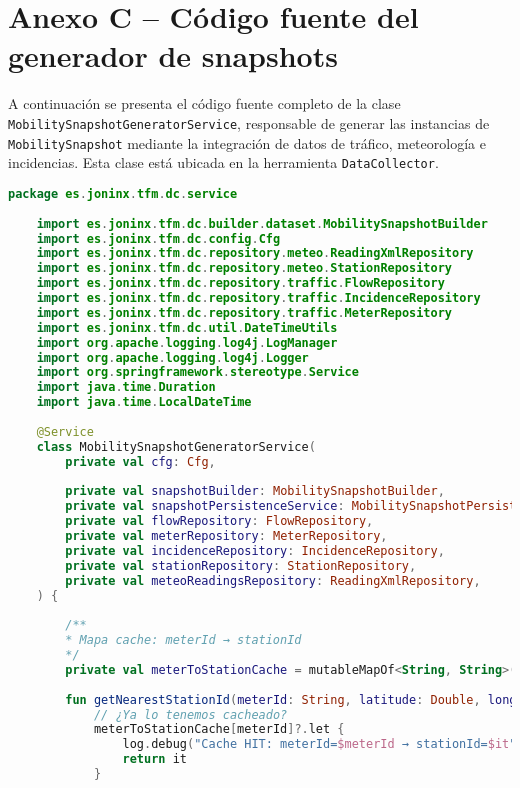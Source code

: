 \section*{Anexo C – Código fuente del generador de snapshots}
\label{anexo:snapshot_generator}

A continuación se presenta el código fuente completo de la clase \texttt{MobilitySnapshotGeneratorService}, responsable de generar las instancias de \texttt{MobilitySnapshot} mediante la integración de datos de tráfico, meteorología e incidencias. Esta clase está ubicada en la herramienta \texttt{DataCollector}.

\begin{lstlisting}[language=Kotlin, caption={Clase MobilitySnapshotGeneratorService}]
	package es.joninx.tfm.dc.service
	
	import es.joninx.tfm.dc.builder.dataset.MobilitySnapshotBuilder
	import es.joninx.tfm.dc.config.Cfg
	import es.joninx.tfm.dc.repository.meteo.ReadingXmlRepository
	import es.joninx.tfm.dc.repository.meteo.StationRepository
	import es.joninx.tfm.dc.repository.traffic.FlowRepository
	import es.joninx.tfm.dc.repository.traffic.IncidenceRepository
	import es.joninx.tfm.dc.repository.traffic.MeterRepository
	import es.joninx.tfm.dc.util.DateTimeUtils
	import org.apache.logging.log4j.LogManager
	import org.apache.logging.log4j.Logger
	import org.springframework.stereotype.Service
	import java.time.Duration
	import java.time.LocalDateTime
	
	@Service
	class MobilitySnapshotGeneratorService(
		private val cfg: Cfg,
	
		private val snapshotBuilder: MobilitySnapshotBuilder,
		private val snapshotPersistenceService: MobilitySnapshotPersistenceService,
		private val flowRepository: FlowRepository,
		private val meterRepository: MeterRepository,
		private val incidenceRepository: IncidenceRepository,
		private val stationRepository: StationRepository,
		private val meteoReadingsRepository: ReadingXmlRepository,
	) {
		
		/**
		* Mapa cache: meterId → stationId
		*/
		private val meterToStationCache = mutableMapOf<String, String>()
		
		fun getNearestStationId(meterId: String, latitude: Double, longitude: Double): String? {
			// ¿Ya lo tenemos cacheado?
			meterToStationCache[meterId]?.let {
				log.debug("Cache HIT: meterId=$meterId → stationId=$it")
				return it
			}
			

\end{lstlisting}
